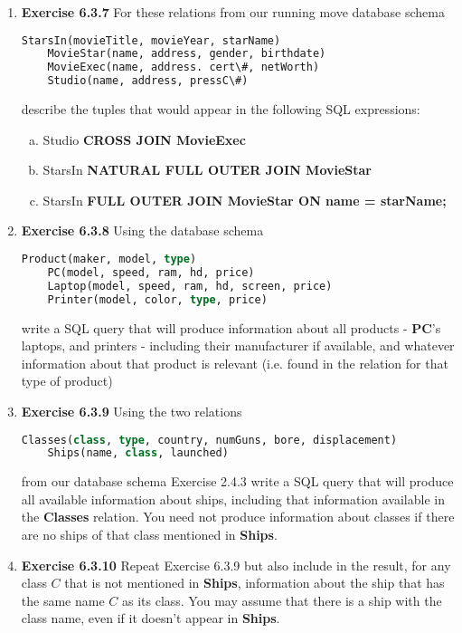 \documentclass[12pt]{article}
\begin{document}
\begin{enumerate}[1.]
    \item \textbf{Exercise 6.3.7} For these relations from our running move database
    schema

    \begin{lstlisting}[language=SQL]
    StarsIn(movieTitle, movieYear, starName)
    MovieStar(name, address, gender, birthdate)
    MovieExec(name, address. cert\#, netWorth)
    Studio(name, address, pressC\#)
    \end{lstlisting}

    \bigskip

    describe the tuples that would appear in the following SQL expressions:

    \begin{enumerate}[a)]
        \item Studio \textbf{CROSS JOIN MovieExec}
        \item StarsIn \textbf{NATURAL FULL OUTER JOIN MovieStar}
        \item StarsIn \textbf{FULL OUTER JOIN MovieStar ON name = starName;}
    \end{enumerate}

    \item \textbf{Exercise 6.3.8} Using the database schema

    \begin{lstlisting}[language=SQL]
    Product(maker, model, type)
    PC(model, speed, ram, hd, price)
    Laptop(model, speed, ram, hd, screen, price)
    Printer(model, color, type, price)
    \end{lstlisting}

    \bigskip

    write a SQL query that will produce information about all products - \textbf{PC}'s
    laptops, and printers - including their manufacturer if available, and whatever
    information about that product is relevant (i.e. found in the relation
    for that type of product)

    \item \textbf{Exercise 6.3.9} Using the two relations

    \begin{lstlisting}[language=SQL]
    Classes(class, type, country, numGuns, bore, displacement)
    Ships(name, class, launched)
    \end{lstlisting}

    \bigskip

    from our database schema Exercise 2.4.3 write a SQL query that will produce
    all available information about ships, including that information available in
    the \textbf{Classes} relation. You need not produce information about classes
    if there are no ships of that class mentioned in \textbf{Ships}.

    \item \textbf{Exercise 6.3.10} Repeat Exercise 6.3.9 but also include in the
    result, for any class $C$ that is not mentioned in \textbf{Ships}, information
    about the ship that has the same name $C$ as its class. You may assume that there
    is a ship with the class name, even if it doesn't appear in \textbf{Ships}.

\end{enumerate}
\end{document}
